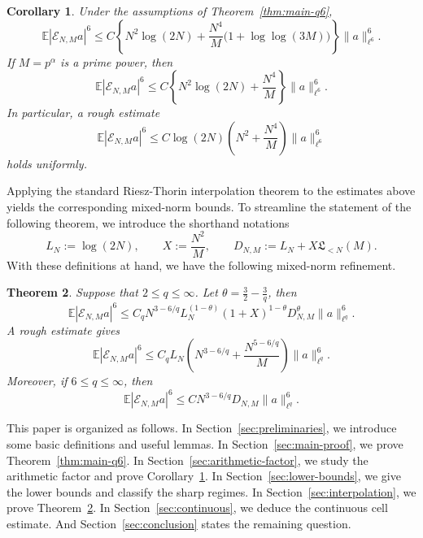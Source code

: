 \documentclass[11pt, twoside]{article}
\numberwithin{equation}{section}
\newtheorem{theorem}{Theorem}[section]
\newtheorem{corollary}[theorem]{Corollary}
\theoremstyle{definition}
\newcommand{\E}{\mathbb E}
\newcommand{\cE}{\mathcal E}
\newcommand{\Lcal}{\mathfrak L}
\begin{document}
\begin{corollary}\label{cor:uniform-q6}
Under the assumptions of Theorem~\ref{thm:main-q6},
\begin{equation}\label{eq:loglog-uniform}
\E|\cE_{N,M}a|^6
\leq
C\left\{
N^2\log(2N)
+\frac{N^4}{M}\bigl(1+\log\log(3M)\bigr)
\right\}\|a\|_{\ell^6}^6.
\end{equation}
If $M=p^\alpha$ is a prime power, then
\begin{equation}\label{eq:prime-power-branch}
\E|\cE_{N,M}a|^6
\leq
C\left\{N^2\log(2N)+\frac{N^4}{M}\right\}\|a\|_{\ell^6}^6.
\end{equation}
In particular, a rough estimate
\begin{equation}\label{eq:common-log}
\E|\cE_{N,M}a|^6
\leq
C\log(2N)\left(N^2+\frac{N^4}{M}\right)\|a\|_{\ell^6}^6
\end{equation}
holds uniformly.
\end{corollary}
Applying the standard Riesz-Thorin interpolation theorem to the estimates above yields the corresponding mixed-norm bounds.
To streamline the statement of the following theorem, we introduce the shorthand notations
$$
L_N:=\log(2N),
\qquad
X:=\frac{N^2}{M},
\qquad
D_{N,M}:=L_N+X\Lcal_{<N}(M).
$$
With these definitions at hand, we have the following mixed-norm refinement.
\begin{theorem}\label{thm:mixed-q}
Suppose that $2\leq q\le\infty$. Let $\theta=\frac{3}{2}-\frac{3}{q}$, then 
\begin{equation}\label{eq:mixed-refined}
\E|\cE_{N,M}a|^6
\leq
C_{q}
N^{3-6/q}
L_N^{(1-\theta)}
(1+X)^{1-\theta}
D_{N,M}^{\theta}
\|a\|_{\ell^q}^6.
\end{equation}
A rough estimate gives
\begin{equation}\label{eq:mixed-clean}
\E|\cE_{N,M}a|^6
\leq
C_{q}
L_N
\left(N^{3-6/q}+\frac{N^{5-6/q}}{M}\right)
\|a\|_{\ell^q}^6.
\end{equation}
Moreover, if $6\leq q\leq\infty$, then
\begin{equation}\label{eq:mixed-qge6}
\E|\cE_{N,M}a|^6\leq C N^{3-6/q}D_{N,M}\|a\|_{\ell^q}^6.
\end{equation}
\end{theorem}

This paper is organized as follows. In Section~\ref{sec:preliminaries}, we introduce some basic 
definitions and useful lemmas.
In Section~\ref{sec:main-proof}, we prove Theorem~\ref{thm:main-q6}.
In Section~\ref{sec:arithmetic-factor}, we study the arithmetic factor and prove
Corollary~\ref{cor:uniform-q6}.
In Section~\ref{sec:lower-bounds}, we give the lower bounds and classify the
sharp regimes.
In Section~\ref{sec:interpolation}, we prove Theorem~\ref{thm:mixed-q}.
In Section~\ref{sec:continuous}, we deduce the continuous cell estimate.
And Section~\ref{sec:conclusion} states the remaining question.
\end{document}
